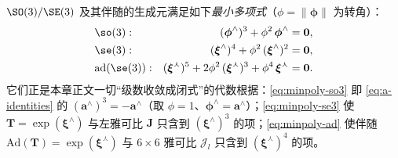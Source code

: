 \begin{theorem}[三个最小多项式]\label{thm:minimal-poly}
$\SO(3)/\SE(3)$ 及其伴随的生成元满足如下\emph{最小多项式}（$\phi=\|\boldsymbol{\phi}\|$ 为转角）：
\begin{align}
  &\so(3):    &(\boldsymbol{\phi}^\wedge)^3+\phi^2\,\boldsymbol{\phi}^\wedge&=\mathbf{0},\label{eq:minpoly-so3}\\
  &\se(3):    &(\boldsymbol{\xi}^\wedge)^4+\phi^2\,(\boldsymbol{\xi}^\wedge)^2&=\mathbf{0},\label{eq:minpoly-se3}\\
  &\mathrm{ad}(\se(3)):&(\boldsymbol{\xi}^\curlywedge)^5+2\phi^2\,(\boldsymbol{\xi}^\curlywedge)^3+\phi^4\,\boldsymbol{\xi}^\curlywedge&=\mathbf{0}.\label{eq:minpoly-ad}
\end{align}
它们正是本章正文一切“级数收敛成闭式”的代数根据：\cref{eq:minpoly-so3} 即 \cref{eq:a-identities} 的 $(\mathbf{a}^\wedge)^3=-\mathbf{a}^\wedge$（取 $\phi=1$、$\boldsymbol{\phi}^\wedge=\mathbf{a}^\wedge$）；\cref{eq:minpoly-se3} 使 $\mathbf{T}=\exp(\boldsymbol{\xi}^\wedge)$ 与左雅可比 $\mathbf{J}$ 只含到 $(\boldsymbol{\xi}^\wedge)^3$ 的项；\cref{eq:minpoly-ad} 使伴随 $\mathrm{Ad}(\mathbf{T})=\exp(\boldsymbol{\xi}^\curlywedge)$ 与 $6\times6$ 雅可比 $\boldsymbol{\mathcal{J}}_l$ 只含到 $(\boldsymbol{\xi}^\curlywedge)^4$ 的项。
\end{theorem}
